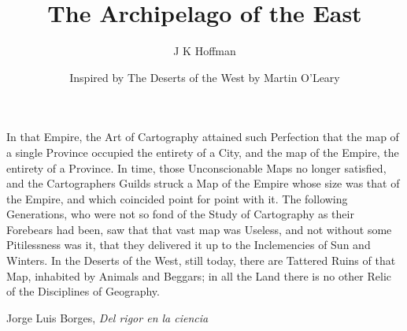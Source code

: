 \documentclass[ebook,10pt]{memoir}
\title{The Archipelago of the East}
\author{J K Hoffman}
\date{Inspired by The Deserts of the West by Martin O'Leary}
\begin{document}
\frontmatter

\begin{titlingpage}
\maketitle
\end{titlingpage}

\clearpage

In that Empire, the Art of Cartography attained such Perfection that the map of
a single Province occupied the entirety of a City, and the map of the Empire,
the entirety of a Province. In time, those Unconscionable Maps no longer
satisfied, and the Cartographers Guilds struck a Map of the Empire whose size
was that of the Empire, and which coincided point for point with it. The
following Generations, who were not so fond of the Study of Cartography as
their Forebears had been, saw that that vast map was Useless, and not without
some Pitilessness was it, that they delivered it up to the Inclemencies of Sun
and Winters. In the Deserts of the West, still today, there are Tattered Ruins
of that Map, inhabited by Animals and Beggars; in all the Land there is no
other Relic of the Disciplines of Geography.

\vspace{1em}
\begin{flushright}
Jorge Luis Borges, \textit{Del rigor en la ciencia}
\end{flushright}

\mainmatter


\end{document}
